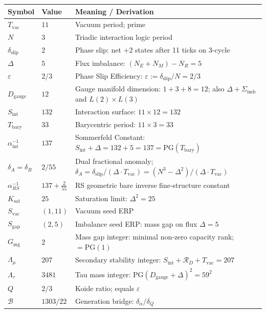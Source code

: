 \documentclass[11pt, letterpaper]{article}
\newcommand{\Tbary}{T_{\mathrm{bary}}}
\newcommand{\Dg}{D_{\mathrm{gauge}}}
\newcommand{\Sint}{S_{\mathrm{int}}}
\newcommand{\Bridge}{\mathcal{B}}
\newcommand{\Sigimb}{\Sigma_{\mathrm{imb}}}
\newcommand{\PG}{\mathrm{PG}}
\newcommand{\aSC}{\alpha^{-1}_{\mathrm{int}}}
\theoremstyle{definition}
\theoremstyle{plain}
\begin{document}
\begin{longtable}{L{2.8cm} L{2.3cm} L{8.0cm}}
\toprule
\textbf{Symbol} & \textbf{Value} & \textbf{Meaning / Derivation} \\
\midrule\endhead\bottomrule\endfoot

$T_{\mathrm{vac}}$ & $11$ & Vacuum period; prime \\[3pt]
$N$ & $3$ & Triadic interaction logic period \\[3pt]
$\delta_{\mathrm{slip}}$ & $2$ & Phase slip:
  net $+2$ states after 11 ticks on 3-cycle \\[3pt]
$\Delta$ & $5$ & Flux imbalance: $(N_E+N_M)-N_R=5$ \\[3pt]
$\varepsilon$ & $2/3$ & Phase Slip Efficiency:
  $\varepsilon:=\delta_{\mathrm{slip}}/N=2/3$ \\[3pt]
$\Dg$ & $12$ & Gauge manifold dimension: $1+3+8=12$;
  also $\Delta+\Sigimb$ and $L(2)\times L(3)$ \\[3pt]
$\Sint$ & $132$ & Interaction surface:
  $11\times 12=132$ \\[3pt]
$\Tbary$ & $33$ & Barycentric period: $11\times 3=33$ \\[3pt]
$\aSC$ & $137$ & Sommerfeld Constant:
  $\Sint+\Delta=132+5=137=\PG(\Tbary)$ \\[3pt]
$\delta_A=\delta_B$ & $2/55$ & Dual fractional anomaly;
  $\delta_A=\delta_{\mathrm{slip}}/(\Delta\cdot T_{\mathrm{vac}})
  =(N^3-\Delta^2)/(\Delta\cdot T_{\mathrm{vac}})$ \\[3pt]
$\alpha^{-1}_{RS}$ & $137+\tfrac{2}{55}$ &
  RS geometric bare inverse fine-structure constant \\[3pt]
$K_{\mathrm{sat}}$ & $25$ & Saturation limit: $\Delta^2=25$ \\[3pt]
$S_{\mathrm{vac}}$ & $(1,11)$ & Vacuum seed ERP \\[3pt]
$S_{\mathrm{gap}}$ & $(2,5)$ & Imbalance seed ERP:
  mass gap on flux $\Delta=5$ \\[3pt]
$G_{\mathrm{mg}}$ & $2$ & Mass gap integer:
  minimal non-zero capacity rank; $=\PG(1)$ \\[3pt]
$\Lambda_\mu$ & $207$ & Secondary stability integer:
  $\Sint+\mathcal{R}_D+T_{\mathrm{vac}}=207$ \\[3pt]
$\Lambda_\tau$ & $3481$ & Tau mass integer:
  $\PG(\Dg+\Delta)^2=59^2$ \\[3pt]
$Q$ & $2/3$ & Koide ratio; equals $\varepsilon$ \\[3pt]
$\Bridge$ & $1303/22$ & Generation bridge: $\delta_\alpha/\delta_Q$ \\[3pt]

\end{longtable}
\end{document}
